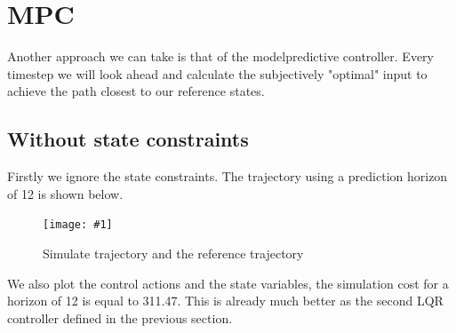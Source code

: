 \documentclass[•]{article}
\newcommand{\apicture}[2] {
  \begin{figure}[H]
  \centering
  \texttt{[image: \#1]}
  \caption{#2}
  \end{figure}
  }
\begin{document}
\section{MPC}
Another approach we can take is that of the modelpredictive controller. Every timestep we will look ahead and calculate the subjectively "optimal" input to achieve the path closest to our reference states. 

\subsection{Without state constraints}
Firstly we ignore the state constraints. The trajectory using a prediction horizon of 12 is shown below. 

\apicture{mpctraj12}{Simulate trajectory and the reference trajectory}

We also plot the control actions and the state variables, the simulation cost for a horizon of 12 is equal to 311.47. This is already much better as the second LQR controller defined in the previous section.
\end{document}
